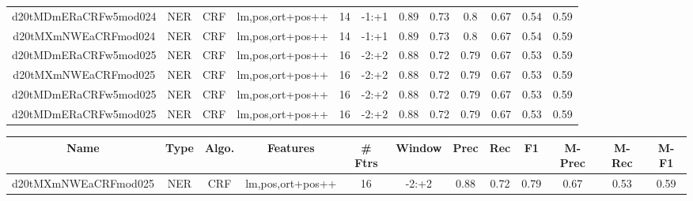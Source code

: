 \documentclass[a4paper]{article}
\begin{document}
\begin{landscape}
\begin{center}
\begin{tabular}{ |c|c|c|c|c|c|c|c|c|c|c|c|}
 
 	
 	\small{ d20tMDmERaCRFw5mod024 } & \small{ NER} & \small{  CRF }  & lm,pos,ort+pos++  &  14 &  \small{  -1:+1 }  &  0.89 & 0.73 & 0.8  &  0.67 & 0.54 & 0.59 \\
 	

 
 	
 	\small{ d20tMXmNWEaCRFmod024 } & \small{ NER} & \small{  CRF }  & lm,pos,ort+pos++  &  14 &  \small{  -1:+1 }  &  0.89 & 0.73 & 0.8  &  0.67 & 0.54 & 0.59 \\
 	

 
 	
 	\small{ d20tMDmERaCRFw5mod025 } & \small{ NER} & \small{  CRF }  & lm,pos,ort+pos++  &  16 &  \small{  -2:+2 }  &  0.88 & 0.72 & 0.79  &  0.67 & 0.53 & 0.59 \\
 	

 
 	
 	\small{ d20tMXmNWEaCRFmod025 } & \small{ NER} & \small{  CRF }  & lm,pos,ort+pos++  &  16 &  \small{  -2:+2 }  &  0.88 & 0.72 & 0.79  &  0.67 & 0.53 & 0.59 \\
 	

 
 	
 	\small{ d20tMDmERaCRFw5mod025 } & \small{ NER} & \small{  CRF }  & lm,pos,ort+pos++  &  16 &  \small{  -2:+2 }  &  0.88 & 0.72 & 0.79  &  0.67 & 0.53 & 0.59 \\
 	

 
 	
 	\small{ d20tMDmERaCRFw5mod025 } & \small{ NER} & \small{  CRF }  & lm,pos,ort+pos++  &  16 &  \small{  -2:+2 }  &  0.88 & 0.72 & 0.79  &  0.67 & 0.53 & 0.59 \\
 	
 \hline
\end{tabular}
\end{center}




\begin{center}
\begin{tabular}{ |c|c|c|c|c|c|c|c|c|c|c|c|} 
 \hline
 	Name & Type & Algo. & Features & \# Ftrs & Window & Prec & Rec & F1 & M-Prec & M-Rec & M-F1\\
 \hline

 	

 
 	
 	\small{ d20tMXmNWEaCRFmod025 } & \small{ NER} & \small{  CRF }  & lm,pos,ort+pos++  &  16 &  \small{  -2:+2 }  &  0.88 & 0.72 & 0.79  &  0.67 & 0.53 & 0.59 \\
 	


\end{tabular}
\end{center}
\end{landscape}
\end{document}
